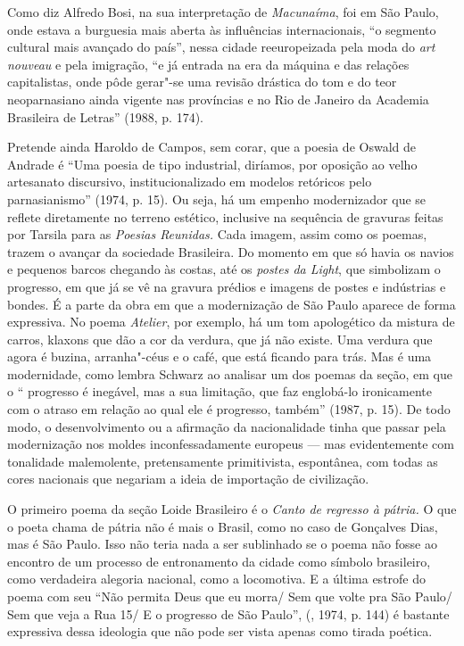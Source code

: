 Como diz Alfredo Bosi, na sua interpretação de \emph{Macunaíma}, foi em
São Paulo, onde estava a burguesia mais aberta às influências
internacionais, ``o segmento cultural mais avançado do país'', nessa
cidade reeuropeizada pela moda do \emph{art nouveau} e pela imigração,
``e já entrada na era da máquina e das relações capitalistas, onde pôde
gerar"-se uma revisão drástica do tom e do teor neoparnasiano ainda
vigente nas províncias e no Rio de Janeiro da Academia Brasileira de
Letras'' (1988, p. 174).

Pretende ainda Haroldo de Campos, sem corar, que a poesia de Oswald de
Andrade é ``Uma poesia de tipo industrial, diríamos, por oposição ao
velho artesanato discursivo, institucionalizado em modelos retóricos
pelo parnasianismo'' (1974, p. 15). Ou seja, há um empenho modernizador
que se reflete diretamente no terreno estético, inclusive na sequência
de gravuras feitas por Tarsila para as \emph{Poesias Reunidas.} Cada
imagem, assim como os poemas, trazem o avançar da sociedade Brasileira.
Do momento em que só havia os navios e pequenos barcos chegando às
costas, até os \emph{postes da Light}, que simbolizam o progresso, em
que já se vê na gravura prédios e imagens de postes e indústrias e
bondes. É a parte da obra em que a modernização de São Paulo aparece de
forma expressiva. No poema \emph{Atelier}, por exemplo, há um tom
apologético da mistura de carros, klaxons que dão a cor da verdura, que
já não existe. Uma verdura que agora é buzina, arranha"-céus e o café,
que está ficando para trás. Mas é uma modernidade, como lembra Schwarz
ao analisar um dos poemas da seção, em que o `` progresso é inegável,
mas a sua limitação, que faz englobá-lo ironicamente com o atraso em
relação ao qual ele é progresso, também'' (1987, p. 15). De todo modo,
o desenvolvimento ou a afirmação da nacionalidade tinha que passar pela
modernização nos moldes inconfessadamente europeus --- mas evidentemente
com tonalidade malemolente, pretensamente primitivista, espontânea, com
todas as cores nacionais que negariam a ideia de importação de
civilização.

O primeiro poema da seção Loide Brasileiro é o \emph{Canto de regresso à
pátria.} O que o poeta chama de pátria não é mais o Brasil, como no caso
de Gonçalves Dias, mas é São Paulo. Isso não teria nada a ser sublinhado
se o poema não fosse ao encontro de um processo de entronamento da
cidade como símbolo brasileiro, como verdadeira alegoria nacional, como
a locomotiva. E a última estrofe do poema com seu ``Não permita Deus que
eu morra/ Sem que volte pra São Paulo/ Sem que veja a Rua 15/ E o
progresso de São Paulo'', (, 1974, p. 144) é bastante expressiva
dessa ideologia que não pode ser vista apenas como tirada poética.

